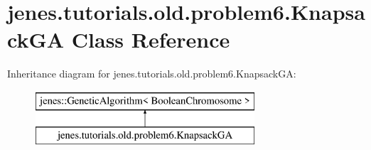 \hypertarget{classjenes_1_1tutorials_1_1old_1_1problem6_1_1_knapsack_g_a}{\section{jenes.\-tutorials.\-old.\-problem6.\-Knapsack\-G\-A Class Reference}
\label{classjenes_1_1tutorials_1_1old_1_1problem6_1_1_knapsack_g_a}
}
Inheritance diagram for jenes.\-tutorials.\-old.\-problem6.\-Knapsack\-G\-A\-:\begin{figure}[H]
\begin{center}
\leavevmode
\includegraphics[height=2.000000cm]{classjenes_1_1tutorials_1_1old_1_1problem6_1_1_knapsack_g_a}
\end{center}
\end{figure}
